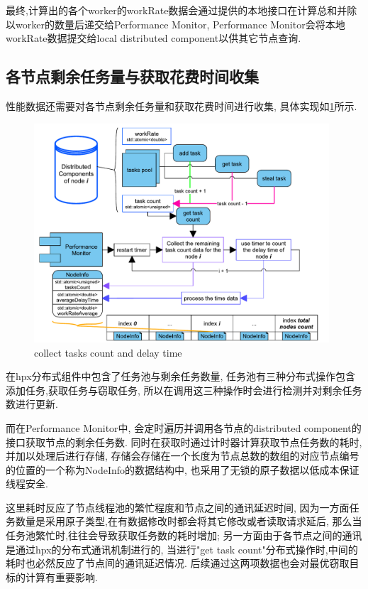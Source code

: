 \documentclass{mproj}
\begin{document}
最终,计算出的各个worker的workRate数据会通过提供的本地接口在计算总和并除以worker的数量后递交给Performance Monitor,
Performance Monitor会将本地workRate数据提交给local distributed component以供其它节点查询.


\subsection{各节点剩余任务量与获取花费时间收集}

性能数据还需要对各节点剩余任务量和获取花费时间进行收集,
具体实现如\cref{fig:tasks_detection}所示.

\begin{figure}[h]
    \centering %
    \includegraphics[width=0.98\textwidth]{images/tasks_detection.pdf} %
    \caption{collect tasks count and delay time} %
    \label{fig:tasks_detection} %
\end{figure}
\FloatBarrier

在hpx分布式组件中包含了任务池与剩余任务数量,
任务池有三种分布式操作包含添加任务,获取任务与窃取任务,
所以在调用这三种操作时会进行检测并对剩余任务数进行更新.

而在Performance Monitor中,
会定时遍历并调用各节点的distributed component的接口获取节点的剩余任务数.
同时在获取时通过计时器计算获取节点任务数的耗时,并加以处理后进行存储,
存储会存储在一个长度为节点总数的数组的对应节点编号的位置的一个称为NodeInfo的数据结构中,
也采用了无锁的原子数据以低成本保证线程安全.

这里耗时反应了节点线程池的繁忙程度和节点之间的通讯延迟时间,
因为一方面任务数量是采用原子类型,在有数据修改时都会将其它修改或者读取请求延后,
那么当任务池繁忙时,往往会导致获取任务数的耗时增加;
另一方面由于各节点之间的通讯是通过hpx的分布式通讯机制进行的,
当进行"get task count"分布式操作时,中间的耗时也必然反应了节点间的通讯延迟情况.
后续通过这两项数据也会对最优窃取目标的计算有重要影响.
\end{document}
